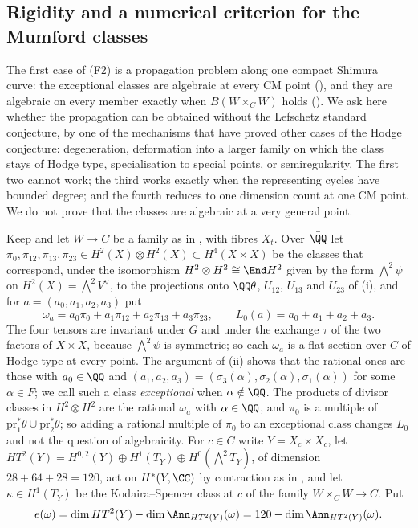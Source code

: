 \subsection{Rigidity and a numerical criterion for the Mumford
classes}\label{ssec:mumfordrigid}

The first case of (F2) is a propagation problem along one compact Shimura
curve: the exceptional classes are algebraic at every CM point
(), and they are algebraic on every member exactly when
$B(W\times_{C}W)$ holds (). We ask here whether the
propagation can be obtained without the Lefschetz standard conjecture, by one
of the mechanisms that have proved other cases of the Hodge conjecture:
degeneration, deformation into a larger family on which the class stays of
Hodge type, specialisation to special points, or semiregularity. The first
two cannot work; the third works exactly when the representing cycles have
bounded degree; and the fourth reduces to one dimension count at one CM
point. We do not prove that the classes are algebraic at a very general
point.

\begin{setupenv}\label{setup:omegaa}
Keep  and let $W\to C$ be a family as in
, with fibres $X_{t}$. Over $\bar{\QQ}$ let
$\pi_{0},\pi_{12},\pi_{13},\pi_{23}\in H^{2}(X)\otimes H^{2}(X)\subset
H^{4}(X\times X)$ be the classes that correspond, under the isomorphism
$H^{2}\otimes H^{2}\cong\End H^{2}$ given by the form ${\textstyle\bigwedge^{2}}\psi$
on $H^{2}(X)={\textstyle\bigwedge^{2}}V^{\vee}$, to the projections onto $\QQ\theta$,
$U_{12}$, $U_{13}$ and $U_{23}$ of (i), and for
$a=(a_{0},a_{1},a_{2},a_{3})$ put
\[
  \omega_{a}=a_{0}\pi_{0}+a_{1}\pi_{12}+a_{2}\pi_{13}+a_{3}\pi_{23},
  \qquad L_{0}(a)=a_{0}+a_{1}+a_{2}+a_{3}.
\]
The four tensors are invariant under $G$ and under the exchange $\tau$ of the
two factors of $X\times X$, because ${\textstyle\bigwedge^{2}}\psi$ is symmetric; so each
$\omega_{a}$ is a flat section over $C$ of Hodge type at every point. The
argument of (ii) shows that the rational ones are those
with $a_{0}\in\QQ$ and $(a_{1},a_{2},a_{3})=(\sigma_{3}(\alpha),
\sigma_{2}(\alpha),\sigma_{1}(\alpha))$ for some $\alpha\in F$; we call such a
class \emph{exceptional} when $\alpha\notin\QQ$. The products of divisor
classes in $H^{2}\otimes H^{2}$ are the rational $\omega_{a}$ with
$\alpha\in\QQ$, and $\pi_{0}$ is a multiple of
$\mathrm{pr}_{1}^{*}\theta\cup\mathrm{pr}_{2}^{*}\theta$; so adding a rational
multiple of $\pi_{0}$ to an exceptional class changes $L_{0}$ and not the
question of algebraicity. For $c\in C$ write $Y=X_{c}\times X_{c}$, let
$HT^{2}(Y)=H^{0,2}(Y)\oplus H^{1}(T_{Y})\oplus H^{0}({\textstyle\bigwedge^{2}}T_{Y})$,
of dimension $28+64+28=120$, act on $H^{*}(Y,\CC)$ by contraction as in
\cite[Setup~4.54]{paperII}, and let $\kappa\in H^{1}(T_{Y})$ be the Kodaira--Spencer class
at $c$ of the family $W\times_{C}W\to C$. Put
\[
  e(\omega)=\dim HT^{2}(Y)-\dim\Ann_{HT^{2}(Y)}(\omega)
  =120-\dim\Ann_{HT^{2}(Y)}(\omega).
\]
\end{setupenv}

